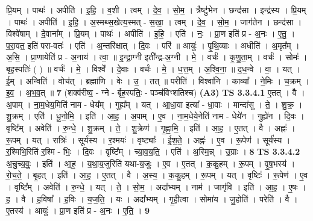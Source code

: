 \documentclass[17pt]{extarticle}
\begin{document}
                  प्रि॒यम् । पाथः॑ । अपीति॑ । इ॒हि॒ । व॒शी । त्वम् । दे॒व॒ । सो॒म॒ । त्रैष्टु॑भेन । छन्द॑सा । इन्द्र॑स्य । प्रि॒यम् । पाथः॑ । अपीति॑ । इ॒हि॒ । अ॒स्मथ्स॒खेत्य॒स्मत् - स॒खा॒ । त्वम् । दे॒व॒ । सो॒म॒ । जाग॑तेन । छन्द॑सा । विश्वे॑षाम् । दे॒वाना᳚म् । प्रि॒यम् । पाथः॑ । अपीति॑ । इ॒हि॒ । एति॑ । नः॒ । प्रा॒ण इति॑ प्र - अ॒नः । ए॒तु॒ । प॒रा॒वत॒ इति॑ परा-वतः॑ । एति॑ । अ॒न्तरि॑क्षात् । दि॒वः । परि॑ ॥ आयुः॑ । पृ॒थि॒व्याः । अधीति॑ । अ॒मृत᳚म् । अ॒सि॒ । प्रा॒णायेति॑ प्र - अ॒नाय॑ । त्वा॒ ॥ इ॒न्द्रा॒ग्नी इती᳚न्द्र-अ॒ग्नी । मे॒ । वर्चः॑ । कृ॒णु॒ता॒म् । वर्चः॑ । सोमः॑ । बृह॒स्पतिः॑ ( ) ॥ वर्चः॑ । मे॒ । विश्वे᳚ । दे॒वाः । वर्चः॑ । मे॒ । ध॒त्त॒म् । अ॒श्वि॒ना॒ ॥ द॒ध॒न्वे । वा॒ । यत् । ई॒म् । अन्विति॑ । वोच॑त् । ब्रह्मा॑णि । वेः । उ॒ । तत् ॥ परीति॑ । विश्वा॑नि । काव्या᳚ । ने॒मिः । च॒क्रम् । इ॒व॒ । अ॒भ॒व॒त् ॥ \textbf{  7} \newline
                  \newline
                      (शक्व॑रीष्व॒ - ग्ने - र्बृह॒स्पतिः॒ - पञ्च॑विꣳशतिश्च)  \textbf{(A3)} \newline \newline
                                \textbf{ TS 3.3.4.1} \newline
                  ए॒तत् । वै । अ॒पाम् । ना॒म॒धेय॒मिति॑ नाम - धेय᳚म् । गुह्य᳚म् । यत् । आ॒धा॒वा इत्या᳚ - धा॒वाः । मान्दा॑सु । ते॒ । शु॒क्र॒ । शु॒क्रम् । एति॑ । धू॒नो॒मि॒ । इति॑ । आ॒ह॒ । अ॒पाम् । ए॒व । ना॒म॒धेये॒नेति॑ नाम - धेये॑न । गुह्ये॑न । दि॒वः । वृष्टि᳚म् । अवेति॑ । रु॒न्धे॒ । शु॒क्रम् । ते॒ । शु॒क्रेण॑ । गृ॒ह्णा॒मि॒ । इति॑ । आ॒ह॒ । ए॒तत् । वै । अह्नः॑ । रू॒पम् । यत् । रात्रिः॑ । सूर्य॑स्य । र॒श्मयः॑ । वृष्ट्याः᳚ । ई॒श॒ते॒ । अह्नः॑ । ए॒व । रू॒पेण॑ । सूर्य॑स्य । र॒श्मिभि॒रिति॑ र॒श्मि - भिः॒ । दि॒वः । वृष्टि᳚म् । च्या॒व॒य॒ति॒ । एति॑ । अ॒स्मि॒न्न् । उ॒ग्राः । \textbf{  8} \newline
                  \newline
                                \textbf{ TS 3.3.4.2} \newline
                  अ॒चु॒च्य॒वुः॒ । इति॑ । आ॒ह॒ । य॒था॒य॒जुरिति॑ यथा-य॒जुः । ए॒व । ए॒तत् । क॒कु॒हम् । रू॒पम् । वृ॒ष॒भस्य॑ । रो॒च॒ते॒ । बृ॒हत् । इति॑ । आ॒ह॒ । ए॒तत् । वै । अ॒स्य॒ । क॒कु॒हम् । रू॒पम् । यत् । वृष्टिः॑ । रू॒पेण॑ । ए॒व । वृष्टि᳚म् । अवेति॑ । रु॒न्धे॒ । यत् । ते॒ । सो॒म॒ । अदा᳚भ्यम् । नाम॑ । जागृ॑वि । इति॑ । आ॒ह॒ । ए॒षः । ह॒ । वै । ह॒विषा᳚ । ह॒विः । य॒ज॒ति॒ । यः । अदा᳚भ्यम् । गृ॒ही॒त्वा । सोमा॑य । जु॒होति॑ । परेति॑ । वै । ए॒तस्य॑ । आयुः॑ । प्रा॒ण इति॑ प्र - अ॒नः । ए॒ति॒ । \textbf{  9} \newline
                  \newline
\end{document}
